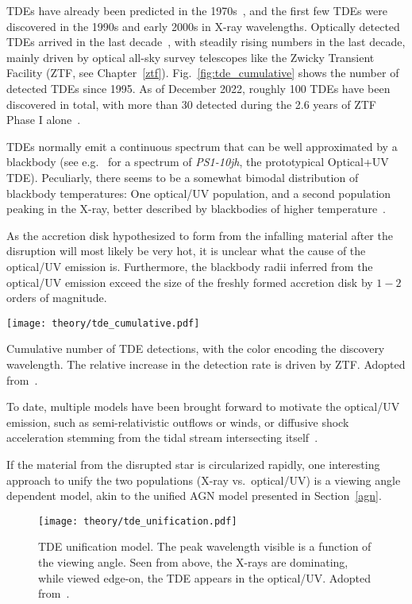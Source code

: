 TDEs have already been predicted in the 1970s~, and the first few TDEs were discovered in the 1990s and early 2000s in X-ray wavelengths. Optically detected TDEs arrived in the last decade~, with steadily rising numbers in the last decade, mainly driven by optical all-sky survey telescopes like the Zwicky Transient Facility (ZTF, see Chapter~\ref{ztf}). Fig.~\ref{fig:tde_cumulative} shows the number of detected TDEs since 1995. As of December 2022, roughly 100 TDEs have been discovered in total, with more than 30 detected during the 2.6 years of ZTF Phase I alone~.

TDEs normally emit a continuous spectrum that can be well approximated by a blackbody (see e.g.~ for a spectrum of \textit{PS1-10jh}, the prototypical Optical+UV TDE). Peculiarly, there seems to be a somewhat bimodal distribution of blackbody temperatures: One optical/UV population, and a second population peaking in the X-ray, better described by blackbodies of higher temperature~\cite{Gezari2021}.

As the accretion disk hypothesized  to form from the infalling material after the disruption will most likely be very hot, it is unclear what the cause of the optical/UV emission is. Furthermore, the blackbody radii inferred from the optical/UV emission exceed the size of the freshly formed accretion disk by $1-2$ orders of magnitude.

\begin{marginfigure}
    \texttt{[image: theory/tde\_cumulative.pdf]}
    \caption[TDE detections]{Cumulative number of TDE detections, with the color encoding the discovery wavelength. The relative increase in the detection rate is driven by ZTF\@. Adopted from~\cite{Gezari2021}.}
\end{marginfigure}

To date, multiple models have been brought forward to motivate the optical/UV emission, such as semi-relativistic outflows or winds, or diffusive shock acceleration stemming from the tidal stream intersecting itself~\cite{Gezari2021}.

If the material from the disrupted star is circularized rapidly, one interesting approach to unify the two populations (X-ray vs.\ optical/UV) is a viewing angle dependent model, akin to the unified AGN model presented in Section~\ref{agn}.

\begin{figure}[htb]
    \texttt{[image: theory/tde\_unification.pdf]}
    \caption[TDE Unification]{TDE unification model. The peak wavelength visible is a function of the viewing angle. Seen from above, the X-rays are dominating, while viewed edge-on, the TDE appears in the optical/UV\@. Adopted from~\cite{Hayasaki2021}.}
\end{figure}

